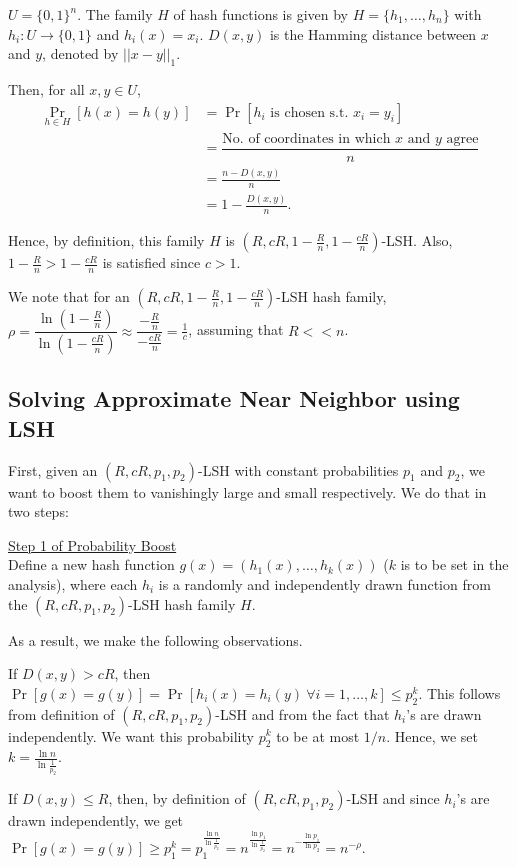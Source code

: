 \documentclass[11pt]{article}
\begin{document}
$U=\{0,1\}^n$.
The family $H$ of hash functions is given by 
$H=\{h_1,\ldots,h_n\}$ with $h_i:U\to \{0,1\}$ and $h_i(x) = x_i$. $D(x,y)$ is the Hamming distance between $x$ and $y$, denoted by $||x-y||_1$.

Then, for all $x,y\in U$,
\begin{align*}
    \Pr_{h\in H}[h(x)=h(y)] &= \Pr[h_i \text{ is chosen s.t. } x_i=y_i]\\ 
    &= \dfrac{\text{No. of coordinates in which $x$ and $y$ agree}}{n}\\
    &=\frac{n-D(x,y)}{n}\\
    &=1-\frac{D(x,y)}{n}.
\end{align*}

Hence, by definition, this family $H$ is $(R,cR,1-\frac{R}{n},1-\frac{cR}{n})$-LSH. Also, $1-\frac{R}{n} > 1-\frac{cR}{n}$ is satisfied since $c> 1$.

We note that for an $(R,cR,1-\frac{R}{n},1-\frac{cR}{n})$-LSH hash family, $\rho=\dfrac{\ln(1-\frac{R}{n})}{\ln(1-\frac{cR}{n})}\approx \dfrac{-\frac{R}{n}}{-\frac{cR}{n}}=\frac{1}{c}$, assuming that $R<<n$.

\subsection{Solving {\sc Approximate Near Neighbor} using LSH}\label{sec}
First, given an $(R,cR,p_1,p_2)$-LSH with constant probabilities $p_1$ and $p_2$, we want to boost them to vanishingly large and small respectively. We do that in two steps:
\begin{mdframed}[backgroundcolor=blue!05,topline=false,bottomline=false,leftline=false,rightline=false] \underline{\sc Step 1 of Probability Boost}\\ Define a new hash function $g(x) = (h_1(x),\ldots,h_k(x))$ ($k$ is to be set in the analysis), where each $h_i$ is a randomly and independently drawn function from the $(R,cR,p_1,p_2)$-LSH hash family $H$.\end{mdframed}
As a result, we make the following observations.
\begin{observation}\label{farcollision}
If $D(x,y)>cR$, then $\Pr[g(x)=g(y)] = \Pr[h_i(x)=h_i(y)~\forall i=1,\ldots,k]\leq p_2^k$. This follows from definition of $(R,cR,p_1,p_2)$-LSH and from the fact that $h_i$'s are drawn independently. We want this probability $p_2^k$ to be at most $1/n$. Hence, we set $k = \frac{\ln n}{\ln {\frac{1}{p_2}}}$. 
\end{observation}
\begin{observation}\label{obs2}
If $D(x,y)\leq R$, then, by definition of $(R,cR,p_1,p_2)$-LSH and since $h_i$'s are drawn independently, we get  $\Pr[g(x)=g(y)]\geq p_1^k = p_1^{\frac{\ln n}{\ln {\frac{1}{p_2}}}}= n^{\frac{\ln p_1}{\ln {\frac{1}{p_2}}}} = n^{-\frac{\ln p_1}{\ln p_2}}=n^{-\rho}$.
\end{observation}
\end{document}

